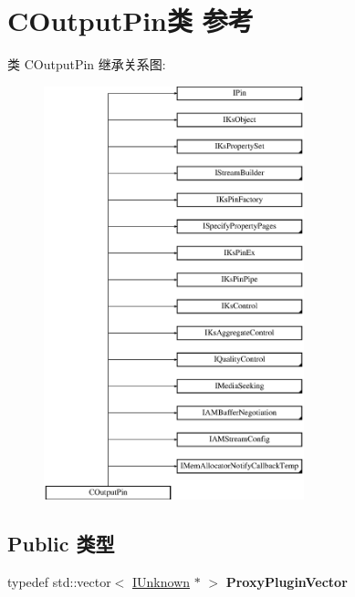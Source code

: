 \hypertarget{class_c_output_pin}{}\section{C\+Output\+Pin类 参考}
\label{class_c_output_pin}
类 C\+Output\+Pin 继承关系图\+:\begin{figure}[H]
\begin{center}
\leavevmode
\includegraphics[height=12.000000cm]{class_c_output_pin}
\end{center}
\end{figure}
\subsection*{Public 类型}
\begin{DoxyCompactItemize}
\item 
\mbox{\label{class_c_output_pin_a662e7497c95c13a9b3e8bf960fd32f0f}} 
typedef std\+::vector$<$ \hyperlink{interface_i_unknown}{I\+Unknown} $\ast$ $>$ {\bfseries Proxy\+Plugin\+Vector}
\end{DoxyCompactItemize}

